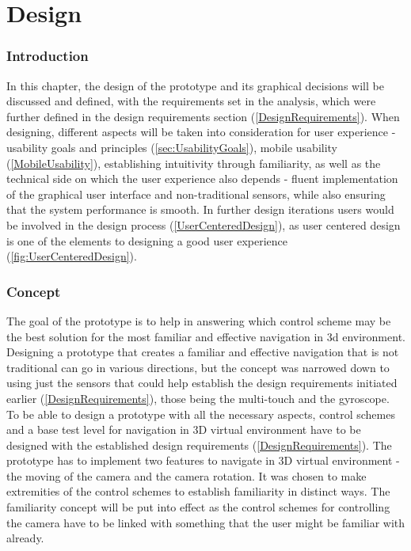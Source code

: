 \chapter{Design}
\subsection{Introduction}
In this chapter, the design of the prototype and its graphical decisions will be discussed and defined, with the requirements set in the analysis, which were further defined in the design requirements section (\ref{DesignRequirements}). When designing, different aspects will be taken into consideration for user experience - usability goals and principles (\ref{sec:UsabilityGoals}), mobile usability (\ref{MobileUsability}), establishing intuitivity through familiarity, as well as the technical side on which the user experience also depends - fluent implementation of the graphical user interface and non-traditional sensors, while also ensuring that the system performance is smooth. In further design iterations users would be involved in the design process (\ref{UserCenteredDesign}), as user centered design is one of the elements to designing a good user experience (\ref{fig:UserCenteredDesign}).

\subsection{Concept}
The goal of the prototype is to help in answering which control scheme may be the best solution for the most familiar and effective navigation in 3d environment. Designing a prototype that creates a familiar and effective navigation that is not traditional can go in various directions, but the concept was narrowed down to using just the sensors that could help establish the design requirements initiated earlier (\ref{DesignRequirements}), those being the multi-touch and the gyroscope.
To be able to design a prototype with all the necessary aspects, control schemes and a base test level for navigation in 3D virtual environment have to be designed with the established design requirements (\ref{DesignRequirements}).
The prototype has to implement two features to navigate in 3D virtual environment - the moving of the camera and the camera rotation. It was chosen to make extremities of the control schemes to establish familiarity in distinct ways. The familiarity concept will be put into effect as the control schemes for controlling the camera have to be linked with something that the user might be familiar with already. 

